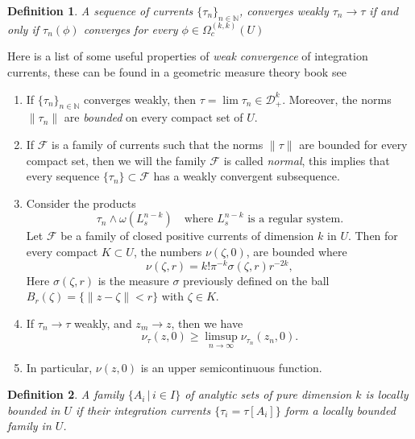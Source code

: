 \documentclass[12pt,twoside,a4paper]{report}
\newtheorem{definition}{Definition}[section]
\newcommand{\nat}{\ensuremath{ \mathbb N }}
\newcommand{\om}{\ensuremath{\Omega}}
\newcommand{\fsheaf}{\ensuremath{\mathcal F }}
\newcommand{\dsheaf}{\ensuremath{\mathcal D }}
\begin{document}
\begin{definition}
A sequence of currents \(\{\tau_n\}_{n\in\nat}\), converges weakly \(\tau_n\rightarrow\tau\) if and only if \(\tau_n(\phi)\) converges for every \(\phi\in\om_c^{(k,k)}(U)\)
\end{definition}
Here is a list of some useful properties of \emph{weak convergence} of integration currents, these can be found in a geometric measure theory book see \cite{federer}

\begin{enumerate}
  \item If $\{\tau_n\}_{n\in\nat}$ converges weakly, then $\tau=\lim\tau_n\in\dsheaf^k_{+}$. Moreover, the norms $\|\tau_n\|$ are \emph{bounded} on every compact set of $U$.

  \item If \(\fsheaf\) is a family of currents such that the norms $\|\tau\|$ are bounded for every compact set, then we will the family \(\fsheaf\) is called \emph{normal}, this implies that every sequence $\{\tau_n\}\subset\fsheaf$ has a weakly convergent subsequence.
  \item Consider the products
        \[
        \tau_n\wedge\omega(L^{n-k}_s)\quad\text{where }L^{n-k}_s\text{ is a regular system}.
        \]
        Let \(\fsheaf\) be a family of closed positive currents of dimension $k$ in $U$. Then for every compact $K\subset U$, the numbers \(\nu(\zeta,0)\), are bounded where
        \begin{equation}
        \nu(\zeta,r)=k!\pi^{-k}\sigma(\zeta,r)r^{-2k},
        \end{equation}
        Here $\sigma(\zeta,r)$ is the measure $\sigma$ previously defined on the ball $B_r(\zeta)=\{\|z-\zeta\|<r\}$ with $\zeta\in K$.
  \item If $\tau_n\rightarrow\tau$ weakly, and $z_m\rightarrow z$, then we have
        \begin{equation}
          \nu_{\tau}(z,0)\geq\limsup_{n\to\infty}\nu_{\tau_n}(z_n,0).
        \end{equation}
  \item In particular, $\nu(z,0)$ is an upper semicontinuous function.
\end{enumerate}
  
\begin{definition}
A family $\{A_i\,|\,i\in I\}$ of analytic sets of pure dimension $k$ is locally bounded in $U$ if their integration currents $\{\tau_i=\tau[A_i]\}$ form a locally bounded family in $U$.
\end{definition}
\end{document}
